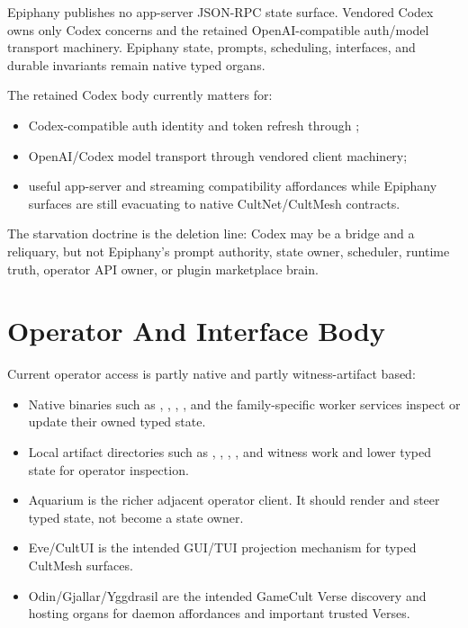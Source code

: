 \documentclass[11pt]{article}
\begin{document}
Epiphany publishes no app-server JSON-RPC state surface. Vendored Codex owns
only Codex concerns and the retained OpenAI-compatible auth/model transport
machinery. Epiphany state, prompts, scheduling, interfaces, and durable
invariants remain native typed organs.

The retained Codex body currently matters for:

\begin{itemize}
  \item Codex-compatible auth identity and token refresh through
  ;
  \item OpenAI/Codex model transport through vendored client machinery;
  \item useful app-server and streaming compatibility affordances while
  Epiphany surfaces are still evacuating to native CultNet/CultMesh contracts.
\end{itemize}

The starvation doctrine is the deletion line: Codex may be a bridge and a
reliquary, but not Epiphany's prompt authority, state owner, scheduler, runtime
truth, operator API owner, or plugin marketplace brain.

\section{Operator And Interface Body}

Current operator access is partly native and partly witness-artifact based:

\begin{itemize}
  \item Native binaries such as ,
  , ,
  , and the family-specific worker services
  inspect or update their owned typed state.
  \item Local artifact directories such as ,
  , ,
  , and
   witness work and lower typed state for
  operator inspection.
  \item Aquarium is the richer adjacent operator client. It should render and
  steer typed state, not become a state owner.
  \item Eve/CultUI is the intended GUI/TUI projection mechanism for typed
  CultMesh surfaces.
  \item Odin/Gjallar/Yggdrasil are the intended GameCult Verse discovery and
  hosting organs for daemon affordances and important trusted Verses.
\end{itemize}
\end{document}
